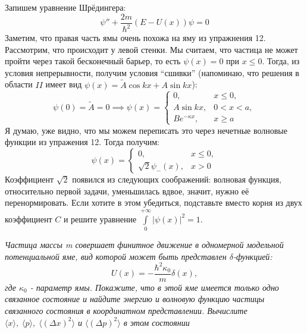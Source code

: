Запишем уравнение Шрёдингера:
\[
\psi'' + \frac{2m}{\hbar^2}(E-U(x))\psi = 0 
\]
Заметим, что правая часть ямы очень похожа на яму из упражнения 12. Рассмотрим, что происходит у левой стенки. Мы считаем, что частица не может пройти через такой бесконечный барьер, то есть $\psi(x) = 0$ при $x\leq 0$. Тогда, из условия непрерывности, получим условия ``сшивки'' (напоминаю, что решения в области $II$ имеет вид $\psi(x) = \widetilde{A}\cos kx + A\sin kx$):
\[
\psi(0) = \widetilde{A} = 0 \implies \psi(x) =
\begin{cases}
    0,& x \leq 0,\\
    A\sin kx,& 0<x<a,\\
    Be^{-\kappa x},& x\geq a
\end{cases}
\]
Я думаю, уже видно, что мы можем переписать это через нечетные волновые функции из упражения 12. Тогда получим:
\[
\psi(x) =
\begin{cases}
    0, & x\leq 0,\\
    \sqrt{2}\psi_-(x), & x>0
\end{cases}
\]
Коэффициент $\sqrt{2}$ появился из следующих соображений: волновая функция, относительно первой задачи, уменьшилась вдвое, значит, нужно её перенормировать. Если хотите в этом убедиться, подставьте вместо корня из двух коэффициент $C$ и решите уравнение $\int\limits_0^{+\infty}|\psi(x)|^2 = 1$.

\begin{center}
    \textit{Частица массы m совершает финитное движение в одномерной модельной потенциальной яме, вид которой может быть представлен $\delta$-функцией:}
    \[
    U(x) = -\frac{\hbar^2\kappa_0}{m}\delta(x),
    \]
    \textit{где $\kappa_0$ - параметр ямы. Покажите, что в этой яме имеется только одно связанное состояние и найдите энергию и волновую функцию частицы связанного состояния в координатном представлении. Вычислите $\langle x \rangle, \; \langle p \rangle, \; \langle (\Delta x)^2\rangle$ и $\langle (\Delta p)^2\rangle$ в этом состоянии}
\end{center}

